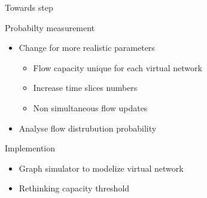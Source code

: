\documentclass{beamer}
\begin{document}
\begin{frame}{Towards step}
  \begin{block}{Probabilty measurement}
     \begin{itemize}
     \item Change for more realistic parameters
       \begin{itemize}
      \item Flow capacity unique for each virtual network
      \item Increase time slices numbers
      \item Non simultaneous flow updates
       \end{itemize}
     \item Analyse flow distrubution probability 
     \end{itemize}
  \end{block}
  
  \begin{block}{Implemention}
    \begin{itemize}  
    \item Graph simulator to modelize virtual network
    \item Rethinking capacity threshold
    \end{itemize}
  \end{block}
\end{frame}
\end{document}
